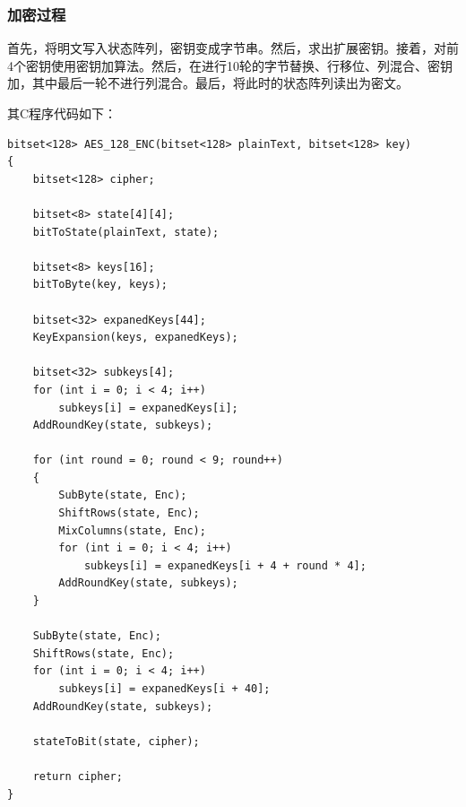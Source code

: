 \subsubsection{加密过程}
首先，将明文写入状态阵列，密钥变成字节串。然后，求出扩展密钥。接着，对前4个密钥使用密钥加算法。然后，在进行10轮的字节替换、行移位、列混合、密钥加，其中最后一轮不进行列混合。最后，将此时的状态阵列读出为密文。\par
其C程序代码如下：
\begin{prove}
\begin{verbatim}
bitset<128> AES_128_ENC(bitset<128> plainText, bitset<128> key)
{
    bitset<128> cipher;
    
    bitset<8> state[4][4];
    bitToState(plainText, state);
    
    bitset<8> keys[16];
    bitToByte(key, keys);
    
    bitset<32> expanedKeys[44];
    KeyExpansion(keys, expanedKeys);
    
    bitset<32> subkeys[4];
    for (int i = 0; i < 4; i++)
        subkeys[i] = expanedKeys[i];
    AddRoundKey(state, subkeys);
    
    for (int round = 0; round < 9; round++)
    {
        SubByte(state, Enc);
        ShiftRows(state, Enc);
        MixColumns(state, Enc);
        for (int i = 0; i < 4; i++)
            subkeys[i] = expanedKeys[i + 4 + round * 4];
        AddRoundKey(state, subkeys);
    }
    
    SubByte(state, Enc);
    ShiftRows(state, Enc);
    for (int i = 0; i < 4; i++)
        subkeys[i] = expanedKeys[i + 40];
    AddRoundKey(state, subkeys);
    
    stateToBit(state, cipher);

    return cipher;
}
\end{verbatim}
\end{prove}

